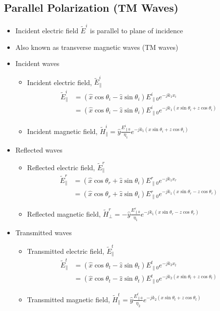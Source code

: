 \documentclass[a4paper]{article}
\begin{document}
\subsection{Parallel Polarization (TM Waves)}
\begin{itemize}
    \item Incident electric field $\widetilde{E}^i$ is parallel to plane of incidence
    \item Also known as transverse magnetic waves (TM waves)
    \item Incident waves
    \begin{itemize}[label=$\circ$]
        \item Incident electric field, $\widetilde{E}^i_\parallel$
        \begin{align*}
           \widetilde{E}^i_\parallel &= (\hat{x}\cos\theta_i -\hat{z}\sin\theta_i)E^i_{\parallel 0} e^{-jk_1x_i}\\
           &= (\hat{x}\cos\theta_i -\hat{z}\sin\theta_i)E^i_{\parallel 0} e^{-jk_1(x\sin\theta_i+z\cos\theta_i)} 
        \end{align*}
        \item Incident magnetic field, $\widetilde{H}^i_\parallel = \hat{y}\displaystyle\frac{E^i_{\parallel 0}}{\eta_1}e^{-jk_1(x\sin\theta_i+z\cos\theta_i)}$
    \end{itemize}
    \item Reflected waves
    \begin{itemize}[label=$\circ$]
        \item Reflected electric field, $\widetilde{E}^r_\parallel$
        \begin{align*}
            \widetilde{E}^r_\parallel &= (\hat{x}\cos\theta_r +\hat{z}\sin\theta_i)E^r_{\parallel 0} e^{-jk_1x_r}\\
            &= (\hat{x}\cos\theta_r +\hat{z}\sin\theta_i)E^r_{\parallel 0} e^{-jk_1(x\sin\theta_r-z\cos\theta_r)}
        \end{align*}
        \item Reflected magnetic field, $\widetilde{H}^r_\perp = -\hat{y}\displaystyle\frac{E^r_{\parallel 0}}{\eta_1}e^{-jk_1(x\sin\theta_r-z\cos\theta_r)}$
    \end{itemize}
    \item Transmitted waves
    \begin{itemize}[label=$\circ$]
        \item Transmitted electric field, $\widetilde{E}^t_\parallel$
        \begin{align*}
            \widetilde{E}^t_\parallel &= (\hat{x}\cos\theta_t-\hat{z}\sin\theta_t)E^t_{\parallel 0}e^{-jk_2x_t}\\
            &= (\hat{x}\cos\theta_t-\hat{z}\sin\theta_t)E^t_{\parallel 0}e^{-jk_2(x\sin\theta_t+z\cos\theta_t)}
        \end{align*}
        \item Transmitted magnetic field, $\widetilde{H}^t_\parallel = \hat{y}\displaystyle\frac{E^t_{\parallel 0}}{\eta_2}e^{-jk_2(x\sin\theta_t+z\cos\theta_t)}$
    \end{itemize}
\end{itemize}
\end{document}
